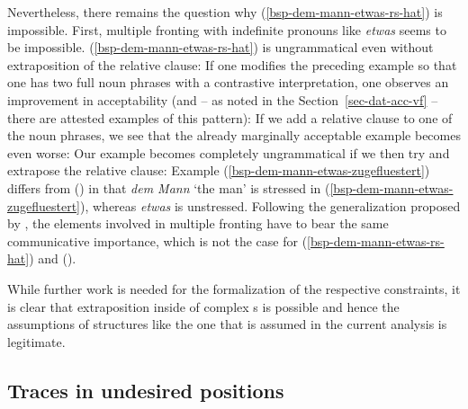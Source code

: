 Nevertheless, there remains the question why (\ref{bsp-dem-mann-etwas-rs-hat}) is impossible. First,
multiple fronting with indefinite pronouns like \emph{etwas} seems to be impossible. (\ref{bsp-dem-mann-etwas-rs-hat}) is ungrammatical even without extraposition of the relative clause:
\z
If one modifies the preceding example so that one has two full noun phrases with a contrastive interpretation,
one observes an improvement in acceptability (and -- as noted in the Section~\ref{sec-dat-acc-vf} -- there are attested examples of this pattern):
\z
If we add a relative clause to one of the noun phrases, we see that the already marginally acceptable example becomes even
worse:
\z
Our example becomes completely ungrammatical if we then try and extrapose the relative clause:
\z
%
Example (\ref{bsp-dem-mann-etwas-zugefluestert}) differs from () in that \emph{dem Mann} `the
man' is stressed in (\ref{bsp-dem-mann-etwas-zugefluestert}), whereas \emph{etwas} is unstressed. Following the generalization proposed
by \ao, the elements involved in multiple fronting have to bear the same communicative importance, which is not the case
for (\ref{bsp-dem-mann-etwas-rs-hat}) and (). 

While further work is needed for the formalization of the respective constraints, it is clear that
extraposition inside of complex \vf{}s is possible and hence the assumptions of structures like the
one that is assumed in the current analysis is legitimate.


\subsection{Traces in undesired positions}
\label{sec-unwanted-traces}

